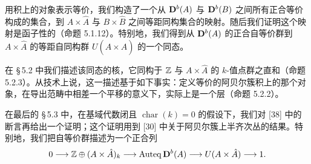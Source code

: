 用积上的对象表示等价，我们构造了一个从 $\mathbf{D}^{b}(A)$ 与 $\mathbf{D}^{b}(B)$ 之间所有正合等价构成的集合，到 $A\times\hat A$ 与 $B\times\hat B$ 之间等距同构集合的映射。随后我们证明这个映射是函子性的（命题 5.1.12）。特别地，我们得到从 $\mathbf{D}^{b}(A)$ 的正合自等价群到 $A\times\hat A$ 的等距自同构群 $U(A\times\hat A)$ 的一个同态。

在 \S\,5.2 中我们描述该同态的核，它同构于 $\mathbb{Z}$ 与 $A\times\hat A$ 的 $k$-值点群之直和（命题 5.2.3）。从技术上说，这一描述基于如下事实：定义等价的阿贝尔簇积上的那个对象，在导出范畴中相差一个平移的意义下，实际上是一个层（命题 5.2.2）。

在最后的 \S\,5.3 中，在基域代数闭且 $\operatorname{char}(k)=0$ 的假设下，我们对 [38] 中的断言再给出一个证明；这个证明用到 [30] 中关于阿贝尔簇上半齐次丛的结果。特别地，我们把自等价群描述为一个正合列
\begin{equation*}
0\longrightarrow \mathbb{Z}\oplus(A\times\hat A)_k\longrightarrow \operatorname{Auteq} \mathbf{D}^{b}(A)\longrightarrow U(A\times\hat A)\longrightarrow 1.
\end{equation*}
